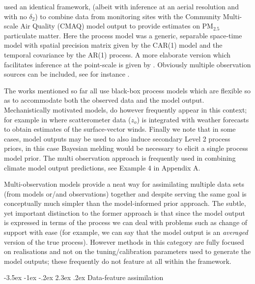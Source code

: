 \documentclass[10pt,a4paper]{article}
\makeatletter
\renewcommand\section{\@startsection{section}{1}{\z@}%
                                  {-3.5ex \@plus -1ex \@minus -.2ex}%
                                  {2.3ex \@plus.2ex}%
                                  {\normalfont\large\bfseries}}
\makeatother
\begin{document}
\noindent \cite{McMillan_2010} used an identical framework, (albeit with inference at an aerial resolution and with no $\delta_2$) to combine data from monitoring sites with the Community Multi-scale Air Quality (CMAQ) model output to provide estimates on PM$_{2.5}$ particulate matter. Here the process model was a generic, separable space-time model with spatial precision matrix given by the CAR(1) model \citep{Rue_2005} and the temporal covariance by the AR(1) process. A more elaborate version which facilitates inference at the point-scale is given by \cite{Sahu_2010}. Obviously multiple observation sources can be included, see for instance \cite{Smith_2007}. 

The works mentioned so far all use black-box process models which are flexible so as to accommodate both the observed data and the model output. Mechanistically motivated models, do however frequently appear in this context; for example in \cite{Milliff_2011} where scatterometer data ($z_o$) is integrated with weather forecasts to obtain estimates of the surface-vector winds. Finally we note that in some cases, model outputs may be used to also induce secondary Level 2 process priors, in this case Bayesian melding \citep{Poole_2000} would be necessary to elicit a single process model prior.  The multi observation approach is frequently used in combining climate model output predictions, see Example 4 in Appendix A.

Multi-observation models provide a neat way for assimilating multiple data sets (from models or/and observations) together and despite serving the same goal is conceptually much simpler than the model-informed prior approach. The subtle, yet important distinction to the former approach is that since the model output is expressed in terms of the process we can deal with problems such as change of support \citep{Wikle_2005} with ease (for example, we can say that the model output is an \emph{averaged} version of the true process). However methods in this category are fully focused on realisations and not on the tuning/calibration parameters used to generate the model outputs; these frequently do not feature at all within the framework.  



\section{Data-feature assimilation}
\end{document}
